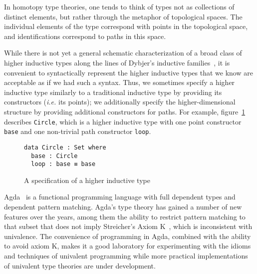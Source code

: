 \documentclass[runningheads]{llncs}
\begin{document}
In homotopy type theories, one tends to think of types not as collections of distinct elements, but rather through the metaphor of topological spaces.
The individual elements of the type correspond with points in the topological space, and identifications correspond to paths in this space.



While there is not yet a general schematic characterization of a broad class of higher inductive types along the lines of Dybjer's inductive families~\cite{Dybjer1994}, it is convenient to syntactically represent the higher inductive types that we know are acceptable as if we had such a syntax.
Thus, we sometimes specify a higher inductive type similarly to a traditional inductive type by providing its constructors (\textit{i.e.} its points); we additionally specify the higher-dimensional structure by providing additional constructors for paths. For example, figure~\ref{fig:circle} describes \Verb|Circle|, which is a higher inductive type with one point constructor \Verb|base| and one non-trivial path constructor \Verb|loop|.
\begin{figure}[h]
\begin{center}
\begin{BVerbatim}
data Circle : Set where
  base : Circle
  loop : base ≡ base
\end{BVerbatim}
\end{center}
\caption{A specification of a higher inductive type}
\label{fig:circle}
\end{figure}
\normalsize
Agda~\cite{norell:thesis} is a functional programming language with full dependent types and dependent pattern matching.
Agda's type theory has gained a number of new features over the years, among them the ability to restrict pattern matching to that subset that does not imply Streicher's Axiom K~\cite{Cockx2014}, which is inconsistent with univalence.
The convenience of programming in Agda, combined with the ability to avoid axiom K, makes it a good laboratory for experimenting with the idioms and techniques of univalent programming while more practical implementations of univalent type theories are under development.
\end{document}
